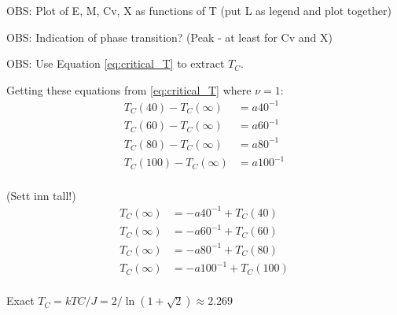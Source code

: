 OBS: Plot of E, M, Cv, X as functions of T (put L as legend and plot together)

OBS: Indication of phase transition? (Peak - at least for Cv and X)

OBS: Use Equation \ref{eq:critical_T} to extract $T_C$.

Getting these equations from \ref{eq:critical_T} where $\nu = 1$:
\begin{align*}
T_C(40) - T_C(\infty) &= a 40^{-1}\\
T_C(60) - T_C(\infty) &= a 60^{-1}\\
T_C(80) - T_C(\infty) &= a 80^{-1}\\
T_C(100) - T_C(\infty) &= a 100^{-1}\\
\end{align*}

(Sett inn tall!)
\begin{align*}
T_C(\infty) &= - a 40^{-1} + T_C(40)\\
T_C(\infty) &= - a 60^{-1} + T_C(60)\\
T_C(\infty) &= - a 80^{-1} + T_C(80)\\
T_C(\infty) &= - a 100^{-1} + T_C(100)\\
\end{align*}

Exact $T_C =  kTC/J = 2/ \ln(1+\sqrt{
2}) \approx 2.269$ \cite{Onsager}